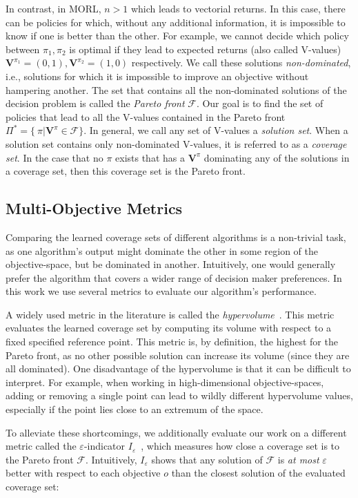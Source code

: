 \documentclass{article}
\renewcommand{\cite}[1]{\citep{#1}}
\newcommand{\mdppolicy}{\pi}
\newcommand{\momdpvaluefunction}{\mathbf{V}}
\begin{document}
In contrast, in MORL, $n > 1$ which leads to vectorial returns. In this case, there can be policies for which, without any additional information, it is impossible to know if one is better than the other. For example, we cannot decide which policy between $\mdppolicy_1, \mdppolicy_2$ is optimal if they lead to expected returns (also called V-values) $\momdpvaluefunction^{\mdppolicy_1}=(0,1), \momdpvaluefunction^{\mdppolicy_2}=(1,0)$ respectively. We call these solutions \emph{non-dominated}, i.e., solutions for which it is impossible to improve an objective without hampering another. The set that contains all the non-dominated solutions of the decision problem is called the \emph{Pareto front} $\mathcal{F}$. Our goal is to find the set of policies that lead to all the V-values contained in the Pareto front $\Pi^* = \{\ \pi | \momdpvaluefunction^{\pi} \in \mathcal{F}\}$. In general, we call any set of V-values a \emph{solution set}. When a solution set contains only  non-dominated V-values, it is referred to as a \emph{coverage set}. In the case that no $\mdppolicy$ exists that has a $\momdpvaluefunction^{\pi}$ dominating any of the solutions in a coverage set, then this coverage set is the Pareto front.

\subsection{Multi-Objective Metrics}
Comparing the learned coverage sets of different algorithms is a non-trivial task, as one algorithm's output might dominate the other in some region of the objective-space, but be dominated in another. Intuitively, one would generally prefer the algorithm that covers a wider range of decision maker preferences. In this work we use several metrics to evaluate our algorithm's performance.

A widely used metric in the literature is called the \emph{hypervolume}~\cite{zitzler2003}. This metric evaluates the learned coverage set by computing its volume with respect to a fixed specified reference point. This metric is, by definition, the highest for the Pareto front, as no other possible solution can increase its volume (since they are all dominated). One disadvantage of the hypervolume is that it can be difficult to interpret. For example, when working in high-dimensional objective-spaces, adding or removing a single point can lead to wildly different hypervolume values, especially if the point lies close to an extremum of the space.

To alleviate these shortcomings, we additionally evaluate our work on a different metric called the $\varepsilon$-indicator $I_\varepsilon$~\cite{zitzler2003}, which measures how close a coverage set is to the Pareto front $\mathcal{F}$. Intuitively, $I_\varepsilon$ shows that any solution of $\mathcal{F}$ is \emph{at most} $\varepsilon$ better with respect to each objective $o$ than the closest solution of the evaluated coverage set:
\end{document}
